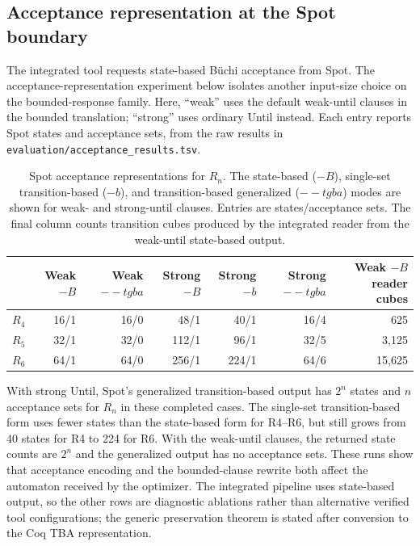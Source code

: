 \documentclass{ieeeaccess}
\begin{document}
\subsection{Acceptance representation at the Spot boundary}
The integrated tool requests state-based B\"uchi acceptance from Spot. The
acceptance-representation experiment below isolates another input-size choice
on the bounded-response family. Here, ``weak'' uses the default weak-until
clauses in the bounded translation; ``strong'' uses ordinary Until instead.
Each entry reports Spot states and acceptance sets, from the raw results in
\texttt{evaluation/acceptance\_results.tsv}.
\begin{table}[t]
\centering
\caption{Spot acceptance representations for $R_n$. The state-based
($-B$), single-set transition-based ($-b$), and transition-based generalized
($--tgba$) modes are shown for weak- and strong-until clauses. Entries are
states/acceptance sets. The final column counts transition cubes produced by
the integrated reader from the weak-until state-based output.}
\label{tab:acceptance-modes}
\footnotesize
\begin{tabular}{@{}lrrrrrr@{}}
\toprule
 & Weak $-B$ & Weak $--tgba$ & Strong $-B$ & Strong $-b$ & Strong $--tgba$ & \shortstack{Weak $-B$\\reader cubes}\\
\midrule
$R_4$ & 16/1 & 16/0 & 48/1 & 40/1 & 16/4 & 625\\
$R_5$ & 32/1 & 32/0 & 112/1 & 96/1 & 32/5 & 3,125\\
$R_6$ & 64/1 & 64/0 & 256/1 & 224/1 & 64/6 & 15,625\\
\bottomrule
\end{tabular}
\end{table}

With strong Until, Spot's generalized transition-based output has $2^n$
states and $n$ acceptance sets for $R_n$ in these completed cases. The
single-set transition-based form uses fewer states than the state-based form
for R4--R6, but still grows from 40 states for R4 to 224 for R6. With the
weak-until clauses, the returned state counts are $2^n$ and the generalized
output has no acceptance sets. These runs show that acceptance encoding and
the bounded-clause rewrite both affect the automaton received by the
optimizer. The integrated pipeline uses state-based output, so the other
rows are diagnostic ablations rather than alternative verified tool
configurations; the generic preservation theorem is stated after conversion
to the Coq TBA representation.
\end{document}
